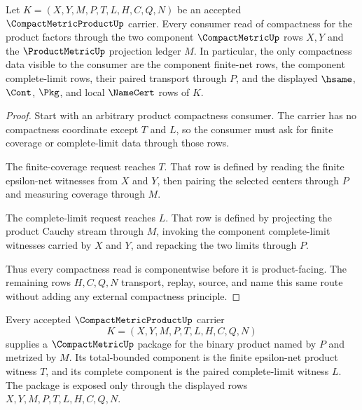 \begin{theorem}\label{thm:compact-metric-product-component-handoff}
Let $K=(X,Y,M,P,T,L,H,C,Q,N)$ be an accepted $\CompactMetricProductUp$ carrier. Every consumer read of compactness for the product factors through the two component $\CompactMetricUp$ rows $X,Y$ and the $\ProductMetricUp$ projection ledger $M$. In particular, the only compactness data visible to the consumer are the component finite-net rows, the component complete-limit rows, their paired transport through $P$, and the displayed $\hsame$, $\Cont$, $\Pkg$, and local $\NameCert$ rows of $K$.
\end{theorem}

\begin{proof}
Start with an arbitrary product compactness consumer. The carrier has no compactness coordinate except $T$ and $L$, so the consumer must ask for finite coverage or complete-limit data through those rows.

The finite-coverage request reaches $T$. That row is defined by reading the finite epsilon-net witnesses from $X$ and $Y$, then pairing the selected centers through $P$ and measuring coverage through $M$.

The complete-limit request reaches $L$. That row is defined by projecting the product Cauchy stream through $M$, invoking the component complete-limit witnesses carried by $X$ and $Y$, and repacking the two limits through $P$.

Thus every compactness read is componentwise before it is product-facing. The remaining rows $H,C,Q,N$ transport, replay, source, and name this same route without adding any external compactness principle.
\end{proof}

\begin{theorem}\label{thm:compact-metric-product-compactmetric-package}
Every accepted $\CompactMetricProductUp$ carrier
$$
K=(X,Y,M,P,T,L,H,C,Q,N)
$$
supplies a $\CompactMetricUp$ package for the binary product named by $P$ and metrized by $M$. Its total-bounded component is the finite epsilon-net product witness $T$, and its complete component is the paired complete-limit witness $L$. The package is exposed only through the displayed rows $X,Y,M,P,T,L,H,C,Q,N$.
\end{theorem}

